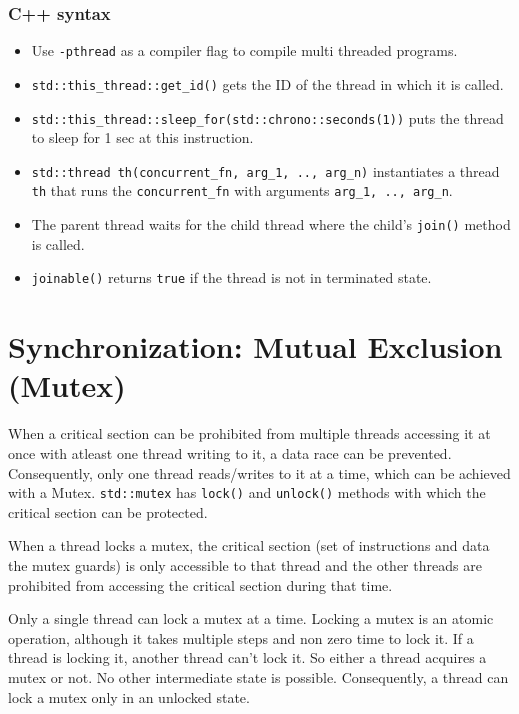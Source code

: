 \documentclass{scrartcl}
\begin{document}
\subsubsection{C++ syntax}
\begin{itemize}
    \item Use \texttt{-pthread} as a compiler flag to compile multi threaded programs.
    \item \texttt{std::this_thread::get_id()} gets the ID of the thread in which it is called.
    \item \texttt{std::this_thread::sleep_for(std::chrono::seconds(1))} puts the thread to sleep for 1 sec at this instruction.
    \item \texttt{std::thread th(concurrent_fn, arg_1, .., arg_n)} instantiates a thread \texttt{th} that runs the \texttt{concurrent_fn} with arguments \texttt{arg_1, .., arg_n}.
    \item The parent thread waits for the child thread where the child's \texttt{join()} method is called.
    \item \texttt{joinable()} returns \texttt{true} if the thread is not in terminated state.
\end{itemize}

\section{Synchronization: Mutual Exclusion (Mutex)}
When a critical section can be prohibited from multiple threads accessing it at once with atleast one thread writing to it, a data race can be prevented. Consequently, only one thread reads/writes to it at a time, which can be achieved with a Mutex. \texttt{std::mutex} has \texttt{lock()} and \texttt{unlock()} methods with which the critical section can be protected.

When a thread locks a mutex, the critical section (set of instructions and data the mutex guards) is only accessible to that thread and the other threads are prohibited from accessing the critical section during that time.

Only a single thread can lock a mutex at a time. Locking a mutex is an atomic operation, although it takes multiple steps and non zero time to lock it. If a thread is locking it, another thread can't lock it. So either a thread acquires a mutex or not. No other intermediate state is possible. Consequently, a thread can lock a mutex only in an unlocked state. 
\end{document}
